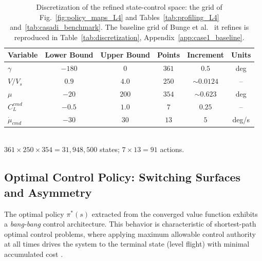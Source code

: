 \documentclass[journal ]{new-aiaa}
\begin{document}
\begin{table}[H]
\centering
\caption{Discretization of the refined state-control space: the grid
of Fig.~\ref{fig:policy_maps_L4} and
Tables~\ref{tab:profiling_L4} and~\ref{tab:casadi_benchmark}. The
baseline grid of Bunge et al.\ \cite{Bunge2018} it refines is
reproduced in Table~\ref{tab:discretization},
Appendix~\ref{app:case1_baseline}.}
\label{tab:discretization_L4}
\begin{tabular}{lccccc}
\hline
\textbf{Variable} & \textbf{Lower Bound} & \textbf{Upper Bound} & \textbf{Points} & \textbf{Increment} & \textbf{Units} \\ \hline
$\gamma$ & $-180$ & $0$ & $361$ & $0.5$ & deg \\
$V/V_s$ & $0.9$ & $4.0$ & $250$ & $\sim 0.0124$ & -- \\
$\mu$ & $-20$ & $200$ & $354$ & $\sim 0.623$ & deg \\
$C_L^{cmd}$ & $-0.5$ & $1.0$ & $7$ & $0.25$ & -- \\
$\dot{\mu}_{cmd}$ & $-30$ & $30$ & $13$ & $5$ & deg/s \\ \hline
\end{tabular}
\\[4pt]
\footnotesize $361 \times 250 \times 354 = 31{,}948{,}500$ states;
$7 \times 13 = 91$ actions.
\end{table}

\subsection{Optimal Control Policy: Switching Surfaces and Asymmetry}

The optimal policy $\pi^*(s)$ extracted from the converged value function exhibits a \textit{bang-bang} control architecture. This behavior is characteristic of shortest-path optimal control problems, where applying maximum allowable control authority at all times drives the system to the terminal state (level flight) with minimal accumulated cost \cite{Bunge2018}.
\end{document}

